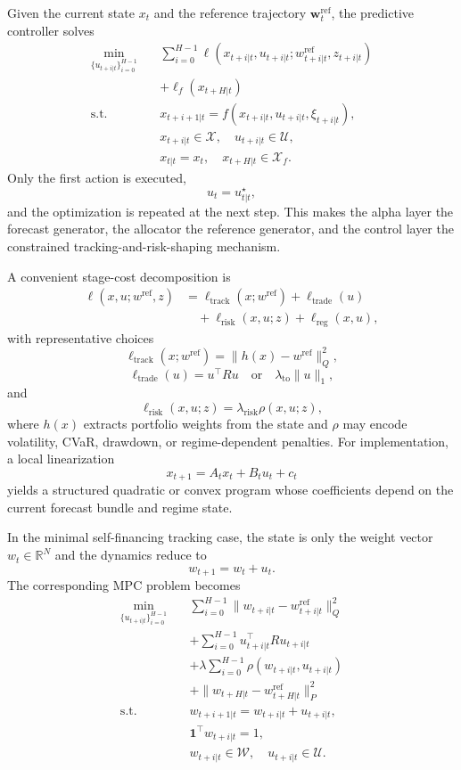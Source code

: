\documentclass[10pt,twocolumn]{article}
\begin{document}
Given the current state $x_t$ and the reference trajectory
$\mathbf{w}_t^{\mathrm{ref}}$, the predictive controller solves
\[
\begin{aligned}
\min_{\{u_{t+i|t}\}_{i=0}^{H-1}} \quad &
\sum_{i=0}^{H-1}
\ell(x_{t+i|t}, u_{t+i|t}; w_{t+i|t}^{\mathrm{ref}}, z_{t+i|t}) \\
&+ \ell_f(x_{t+H|t}) \\
\text{s.t.} \quad &
x_{t+i+1|t} = f(x_{t+i|t}, u_{t+i|t}, \xi_{t+i|t}), \\
& x_{t+i|t} \in \mathcal{X}, \quad u_{t+i|t} \in \mathcal{U}, \\
& x_{t|t} = x_t, \quad x_{t+H|t} \in \mathcal{X}_f.
\end{aligned}
\]
Only the first action is executed,
\[
u_t = u_{t|t}^{\star},
\]
and the optimization is repeated at the next step. This makes the alpha layer
the forecast generator, the allocator the reference generator, and the control
layer the constrained tracking-and-risk-shaping mechanism.

A convenient stage-cost decomposition is
\[
\begin{aligned}
\ell(x,u; w^{\mathrm{ref}}, z)
&=
\ell_{\mathrm{track}}(x; w^{\mathrm{ref}})
+ \ell_{\mathrm{trade}}(u) \\
&\quad
+ \ell_{\mathrm{risk}}(x,u; z)
+ \ell_{\mathrm{reg}}(x,u),
\end{aligned}
\]
with representative choices
\[
\ell_{\mathrm{track}}(x; w^{\mathrm{ref}})
=
\lVert h(x) - w^{\mathrm{ref}} \rVert_Q^2,
\]
\[
\ell_{\mathrm{trade}}(u)
=
u^\top R u
\quad \text{or} \quad
\lambda_{\mathrm{to}} \lVert u \rVert_1,
\]
and
\[
\ell_{\mathrm{risk}}(x,u; z)
=
\lambda_{\mathrm{risk}} \rho(x,u; z),
\]
where $h(x)$ extracts portfolio weights from the state and $\rho$ may encode
volatility, CVaR, drawdown, or regime-dependent penalties. For implementation,
a local linearization
\[
x_{t+1} = A_t x_t + B_t u_t + c_t
\]
yields a structured quadratic or convex program whose coefficients depend on
the current forecast bundle and regime state.

In the minimal self-financing tracking case, the state is only the weight
vector $w_t \in \mathbb{R}^N$ and the dynamics reduce to
\[
w_{t+1} = w_t + u_t.
\]
The corresponding MPC problem becomes
\[
\begin{aligned}
\min_{\{u_{t+i|t}\}_{i=0}^{H-1}} \quad &
\sum_{i=0}^{H-1}
\lVert w_{t+i|t} - w_{t+i|t}^{\mathrm{ref}} \rVert_Q^2 \\
&+ \sum_{i=0}^{H-1}
u_{t+i|t}^\top R u_{t+i|t} \\
&+ \lambda \sum_{i=0}^{H-1}
\rho(w_{t+i|t}, u_{t+i|t}) \\
&+ \lVert w_{t+H|t} - w_{t+H|t}^{\mathrm{ref}} \rVert_P^2 \\
\text{s.t.} \quad &
w_{t+i+1|t} = w_{t+i|t} + u_{t+i|t}, \\
& \mathbf{1}^\top w_{t+i|t} = 1, \\
& w_{t+i|t} \in \mathcal{W}, \quad u_{t+i|t} \in \mathcal{U}.
\end{aligned}
\]
\end{document}
